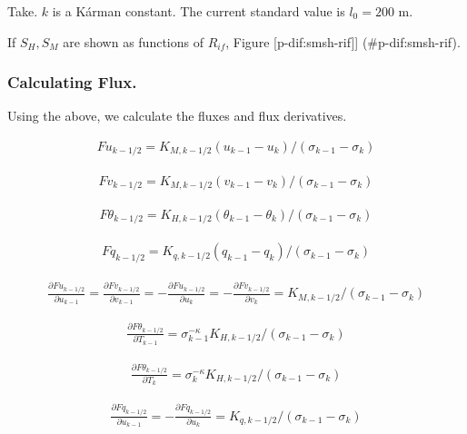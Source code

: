 Take. \(k\) is a Kárman constant. The current standard value is
\(l_0=200\) m.

If \(S_H, S_M\) are shown as functions of \(R_{if}\), Figure
{[}p-dif:smsh-rif{]}{]} (\#p-dif:smsh-rif).

\hypertarget{calculating-flux.}{%
\subsubsection{Calculating Flux.}\label{calculating-flux.}}

Using the above, we calculate the fluxes and flux derivatives.

\begin{eqnarray}
  Fu_{k-1/2} = K_{M,k-1/2}(u_{k-1}-u_{k})/(\sigma_{k-1}-\sigma_{k})
\end{eqnarray}

\begin{eqnarray}
  Fv_{k-1/2} = K_{M,k-1/2}(v_{k-1}-v_{k})/(\sigma_{k-1}-\sigma_{k})
\end{eqnarray}

\begin{eqnarray}
  F\theta_{k-1/2} 
  = K_{H,k-1/2}(\theta_{k-1}-\theta_{k})/(\sigma_{k-1}-\sigma_{k})
\end{eqnarray}

\begin{eqnarray}
  Fq_{k-1/2} = K_{q,k-1/2}(q_{k-1}-q_{k})/(\sigma_{k-1}-\sigma_{k})
\end{eqnarray}

\begin{eqnarray}
     \frac{\partial Fu_{k-1/2}}{\partial u_{k-1}} =   \frac{\partial Fv_{k-1/2}}{\partial v_{k-1}} 
  = -\frac{\partial Fu_{k-1/2}}{\partial u_{k}} = - \frac{\partial Fv_{k-1/2}}{\partial v_{k}}  
  = K_{M,k-1/2}/(\sigma_{k-1}-\sigma_{k})
\end{eqnarray}

\begin{eqnarray}
  \frac{\partial F\theta_{k-1/2}}{\partial T_{k-1}}
  = \sigma_{k-1}^{-\kappa} K_{H,k-1/2}/(\sigma_{k-1}-\sigma_{k})
\end{eqnarray}

\begin{eqnarray}
  \frac{\partial F\theta_{k-1/2}}{\partial T_{k}}
 = \sigma_{k}^{-\kappa} K_{H,k-1/2}/(\sigma_{k-1}-\sigma_{k})
\end{eqnarray}

\begin{eqnarray}
  \frac{\partial Fq_{k-1/2}}{\partial u_{k-1}}
 = - \frac{\partial Fq_{k-1/2}}{\partial u_{k}}
 = K_{q,k-1/2}/(\sigma_{k-1}-\sigma_{k})
\end{eqnarray}

